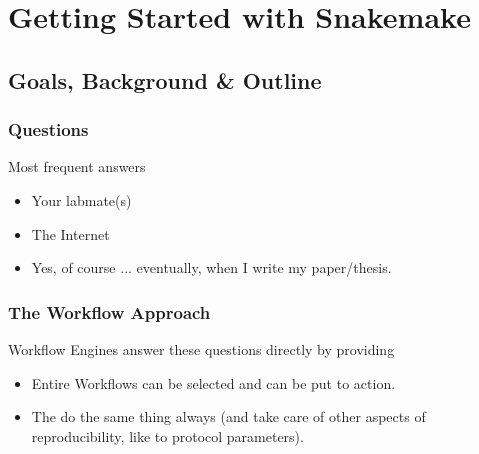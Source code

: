 \section{Getting Started with Snakemake}

\subsection{Goals, Background \& Outline}

\begin{frame}
  \frametitle{Questions}
                                                                               
  \pause
  \begin{block}{Most frequent answers}
   \begin{itemize}
    \item Your labmate(s)
    \item The Internet
    \item Yes, of course ... eventually, when I write my paper/thesis.
   \end{itemize}
  \end{block}
\end{frame}

\begin{frame}
  \frametitle{The Workflow Approach}
  Workflow Engines answer these questions directly by providing
  \begin{itemize}
   \item Entire Workflows can be selected and can be put to action.
   \item The do the same thing always (and take care of other aspects of reproducibility, like to protocol parameters).
  \end{itemize}
\end{frame}

